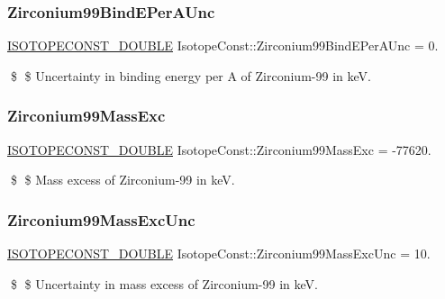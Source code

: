 \subsubsection{\texorpdfstring{Zirconium99\+Bind\+E\+Per\+A\+Unc}{Zirconium99BindEPerAUnc}}
{\footnotesize\ttfamily \mbox{\hyperlink{group___isotope_const-_macros_ga8f45a7272ce02c0b4c65c44636ed719a}{I\+S\+O\+T\+O\+P\+E\+C\+O\+N\+S\+T\+\_\+\+D\+O\+U\+B\+LE}} Isotope\+Const\+::\+Zirconium99\+Bind\+E\+Per\+A\+Unc = 0.}

\$ \$ Uncertainty in binding energy per A of Zirconium-\/99 in keV. \mbox{\label{group___isotope_const-_zirconium-_zr99_ga0339c554f05415e0d38df2c5012c45a7}} 
\subsubsection{\texorpdfstring{Zirconium99\+Mass\+Exc}{Zirconium99MassExc}}
{\footnotesize\ttfamily \mbox{\hyperlink{group___isotope_const-_macros_ga8f45a7272ce02c0b4c65c44636ed719a}{I\+S\+O\+T\+O\+P\+E\+C\+O\+N\+S\+T\+\_\+\+D\+O\+U\+B\+LE}} Isotope\+Const\+::\+Zirconium99\+Mass\+Exc = -\/77620.}

\$ \$ Mass excess of Zirconium-\/99 in keV. \mbox{\label{group___isotope_const-_zirconium-_zr99_ga6ab98b15afa53f8f92901f96455e0e2f}} 
\subsubsection{\texorpdfstring{Zirconium99\+Mass\+Exc\+Unc}{Zirconium99MassExcUnc}}
{\footnotesize\ttfamily \mbox{\hyperlink{group___isotope_const-_macros_ga8f45a7272ce02c0b4c65c44636ed719a}{I\+S\+O\+T\+O\+P\+E\+C\+O\+N\+S\+T\+\_\+\+D\+O\+U\+B\+LE}} Isotope\+Const\+::\+Zirconium99\+Mass\+Exc\+Unc = 10.}

\$ \$ Uncertainty in mass excess of Zirconium-\/99 in keV. \mbox{\label{group___isotope_const-_zirconium-_zr99_ga1f234ae847639741e425271eded9933b}} 
